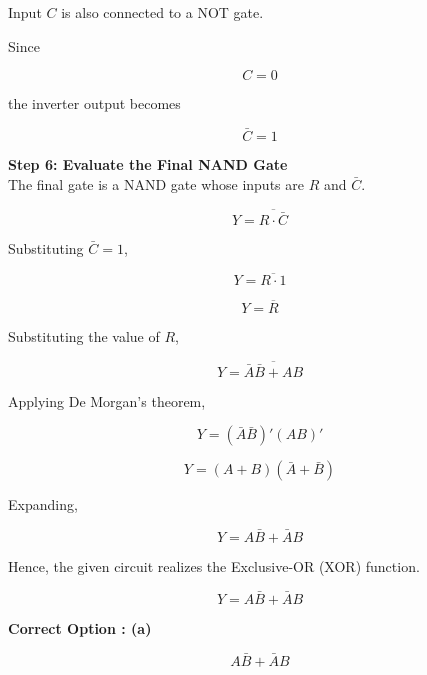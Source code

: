 \documentclass[12pt,a4paper]{article}
\begin{document}
\begin{solutionbox}
Input $C$ is also connected to a NOT gate.

Since

\[
C=0
\]

the inverter output becomes

\[
\bar C = 1
\]

\vspace{0.3cm}

\textbf{Step 6: Evaluate the Final NAND Gate} \\

The final gate is a NAND gate whose inputs are $R$ and $\bar C$.

\[
Y=\overline{R\cdot\bar C}
\]

Substituting $\bar C=1$,

\[
Y=\overline{R\cdot1}
\]

\[
Y=\overline{R}
\]

Substituting the value of $R$,

\[
Y=\overline{\bar A\bar B+AB}
\]

Applying De Morgan's theorem,

\[
Y=(\bar A\bar B)'(AB)'
\]

\[
Y=(A+B)(\bar A+\bar B)
\]

Expanding,

\[
Y=A\bar B+\bar AB
\]

\vspace{0.3cm}

Hence, the given circuit realizes the Exclusive-OR (XOR) function.

\[
\boxed{Y=A\bar B+\bar AB}
\]

\begin{center}

\begin{tcolorbox}[
width=0.55\textwidth,
colback=white,
colframe=black,
boxrule=0.8pt,
sharp corners,
center title,
halign=center
]

\textbf{\Large Correct Option : (a)}

\vspace{0.15cm}

\[
\boxed{A\bar B+\bar AB}
\]

\end{tcolorbox}

\end{center}

\end{solutionbox}
\end{document}
